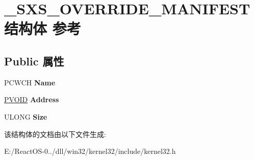 \hypertarget{struct___s_x_s___o_v_e_r_r_i_d_e___m_a_n_i_f_e_s_t}{}\section{\+\_\+\+S\+X\+S\+\_\+\+O\+V\+E\+R\+R\+I\+D\+E\+\_\+\+M\+A\+N\+I\+F\+E\+S\+T结构体 参考}
\label{struct___s_x_s___o_v_e_r_r_i_d_e___m_a_n_i_f_e_s_t}
\subsection*{Public 属性}
\begin{DoxyCompactItemize}
\item 
\mbox{\label{struct___s_x_s___o_v_e_r_r_i_d_e___m_a_n_i_f_e_s_t_a9b62e602b6dfeb799338144f118bde17}} 
P\+C\+W\+CH {\bfseries Name}
\item 
\mbox{\label{struct___s_x_s___o_v_e_r_r_i_d_e___m_a_n_i_f_e_s_t_a7f0dde5a4b953dbfc079966c1517dded}} 
\hyperlink{interfacevoid}{P\+V\+O\+ID} {\bfseries Address}
\item 
\mbox{\label{struct___s_x_s___o_v_e_r_r_i_d_e___m_a_n_i_f_e_s_t_a5f051d55bfc73f742ed1c9a737cb9816}} 
U\+L\+O\+NG {\bfseries Size}
\end{DoxyCompactItemize}


该结构体的文档由以下文件生成\+:\begin{DoxyCompactItemize}
\item 
E\+:/\+React\+O\+S-\/0../dll/win32/kernel32/include/kernel32.\+h\end{DoxyCompactItemize}

